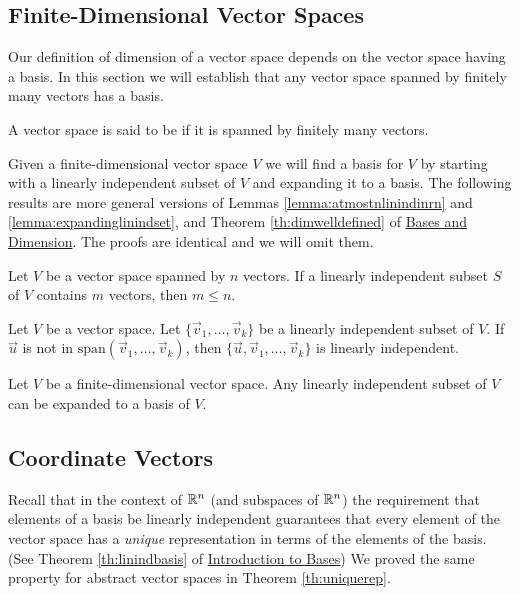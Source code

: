 \documentclass{ximera}
\begin{document}
\subsection*{Finite-Dimensional Vector Spaces}
Our definition of dimension of a vector space depends on the vector space having a basis.  In this section we will establish that any vector space spanned by finitely many vectors has a basis.

\begin{definition}\label{def:findimvectorspace}
A vector space is said to be  if it is spanned by finitely many vectors.
\end{definition}

Given a finite-dimensional vector space $V$ we will find a basis for $V$ by starting with a linearly independent subset of $V$ and expanding it to a basis.  The following results are more general versions of Lemmas \ref{lemma:atmostnlinindinrn} and \ref{lemma:expandinglinindset}, and Theorem \ref{th:dimwelldefined} of \href{https://ximera.osu.edu/linearalgebradzv3/LinearAlgebraInteractiveIntro/VSP-0035/main}{Bases and Dimension}.  The proofs are identical and we will omit them.
\begin{lemma}\label{lemma:atmostnlinindinabstract}
Let $V$ be a vector space spanned by $n$ vectors.  If a linearly independent subset $S$ of $V$ contains $m$ vectors, then $m\leq n$.
\end{lemma}

\begin{lemma}\label{lemma:expandinglinindsetabstract}
Let $V$ be a vector space.  Let $\{\vec{v}_1,\ldots ,\vec{v}_k\}$ be a linearly independent subset of $V$.  If $\vec{u}$ is not in $\mbox{span}(\vec{v}_1,\ldots ,\vec{v}_k)$, then $\{\vec{u},\vec{v}_1,\ldots ,\vec{v}_k\}$ is linearly independent.
\end{lemma}

\begin{theorem}\label{th:expandtobasisabstract}
Let $V$ be a finite-dimensional vector space.  Any linearly independent subset of $V$ can be expanded to a basis of $V$.
\end{theorem}

\subsection*{Coordinate Vectors}

Recall that in the context of $\mathbb{R}^n$ (and subspaces of $\mathbb{R}^n$) the requirement that elements of a basis be linearly independent guarantees that every element of the vector space has a {\it unique} representation in terms of the elements of the basis.  (See Theorem \ref{th:linindbasis} of \href{https://ximera.osu.edu/linearalgebradzv3/LinearAlgebraInteractiveIntro/VSP-0030/main}{Introduction to Bases})  We proved the same property for abstract vector spaces in Theorem \ref{th:uniquerep}.
\end{document}
